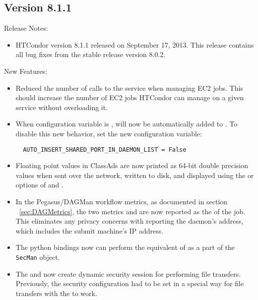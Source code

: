 \subsection*{\label{sec:New-8-1-1}Version 8.1.1}

\noindent Release Notes:

\begin{itemize}

\item HTCondor version 8.1.1 released on September 17, 2013.
This release contains all bug fixes from the stable release version 8.0.2.

\end{itemize}


\noindent New Features:

\begin{itemize}

\item Reduced the number of calls to the service when managing EC2 jobs. This
should increase the number of EC2 jobs HTCondor can manage on a given service
without overloading it.

\item When configuration variable  is ,
 will now be automatically added to .
To disable this new behavior, set the new configuration variable:
\begin{verbatim}
  AUTO_INSERT_SHARED_PORT_IN_DAEMON_LIST = False
\end{verbatim}

\item Floating point values in ClassAds are now printed as 64-bit
double precision values when sent over the network, written to disk, and
displayed using the  or  options of
 and .

\item In the Pegasus/DAGMan workflow metrics,
as documented in section ~\ref{sec:DAGMetrics},
the two metrics
 and  are now reported
as the  of the  job.  This
eliminates any privacy concerns with reporting the  
daemon's address,
which includes the submit machine's IP address.

\item The python bindings now can perform the equivalent of 
 as a part of the \texttt{SecMan} object.

\item The  and  now create
dynamic security session for performing file transfers.
Previously, the security configuration had to be set in a special
way for file transfers with the  to work.

\end{itemize}

